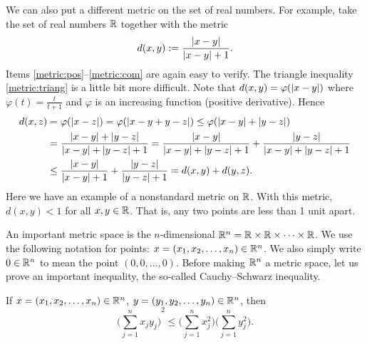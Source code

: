 \begin{example}
We can also put a different metric on the set of real numbers.
For example, take the set of real numbers ${\mathbb{R}}$ together with the metric
\begin{equation*}
d(x,y) :=
\frac{\left\lvert {x-y} \right\rvert}{\left\lvert {x-y} \right\rvert+1} .
\end{equation*}
Items \ref{metric:pos}--\ref{metric:com} are again easy to verify.  The
triangle inequality \ref{metric:triang} is a little bit more difficult.
Note that $d(x,y) = \varphi(\left\lvert {x-y} \right\rvert)$ where $\varphi(t) =
\frac{t}{t+1}$ and $\varphi$ is an increasing function
(positive derivative).  Hence
\begin{equation*}
\begin{split}
d(x,z) & = \varphi(\left\lvert {x-z} \right\rvert) = 
\varphi(\left\lvert {x-y+y-z} \right\rvert) \leq
\varphi(\left\lvert {x-y} \right\rvert+\left\lvert {y-z} \right\rvert)
\\
& =
\frac{\left\lvert {x-y} \right\rvert+\left\lvert {y-z} \right\rvert}{\left\lvert {x-y} \right\rvert+\left\lvert {y-z} \right\rvert+1} =
\frac{\left\lvert {x-y} \right\rvert}{\left\lvert {x-y} \right\rvert+\left\lvert {y-z} \right\rvert+1} +
\frac{\left\lvert {y-z} \right\rvert}{\left\lvert {x-y} \right\rvert+\left\lvert {y-z} \right\rvert+1}
\\
& \leq
\frac{\left\lvert {x-y} \right\rvert}{\left\lvert {x-y} \right\rvert+1} +
\frac{\left\lvert {y-z} \right\rvert}{\left\lvert {y-z} \right\rvert+1} =
d(x,y)+ d(y,z) .
\end{split}
\end{equation*}
Here we have an example of a nonstandard metric on ${\mathbb{R}}$.  With this metric,
$d(x,y) < 1$ for all $x,y \in {\mathbb{R}}$.  That is,
any two points are less than 1 unit apart.
\end{example}

An important metric space is the
$n$-dimensional \emph{}
${\mathbb{R}}^n = {\mathbb{R}} \times {\mathbb{R}} \times \cdots \times {\mathbb{R}}$.   We use the following
notation for points: $x =(x_1,x_2,\ldots,x_n) \in {\mathbb{R}}^n$.  We also
simply write $0 \in {\mathbb{R}}^n$ to mean the point $(0,0,\ldots,0)$.  Before
making ${\mathbb{R}}^n$ a metric space, let us prove an important inequality, the
so-called Cauchy--Schwarz inequality.

\begin{lemma}
If $x =(x_1,x_2,\ldots,x_n) \in {\mathbb{R}}^n$, $y =(y_1,y_2,\ldots,y_n) \in
{\mathbb{R}}^n$, then
\begin{equation*}
{\biggl( \sum_{j=1}^n x_j y_j \biggr)}^2
\leq
\biggl(\sum_{j=1}^n x_j^2 \biggr)
\biggl(\sum_{j=1}^n y_j^2 \biggr) .
\end{equation*}
\end{lemma}

